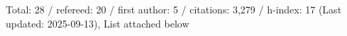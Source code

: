 Total: 28 / refereed: 20 / first author: 5 / citations: 3,279 / h-index: 17 (Last updated: 2025-09-13), List attached below